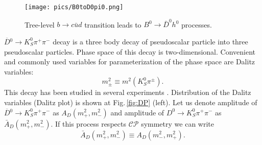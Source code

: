 \documentclass[preprint,aps,showpacs]{revtex4}
\newcommand{\cpconj}{\ensuremath{\mathcal{CP}}\xspace}
\newcommand{\kspp}{\ensuremath{K^0_S\pi^+\pi^-}\xspace}
\newcommand{\dbkpp}{\ensuremath{\overline{D}{}^0\to K^0_S\pi^+\pi^-}\xspace}
\newcommand{\bdh}{\ensuremath{B^0\to \bar D^0h^0}\xspace}
\begin{document}
\begin{figure}[htb]
\texttt{[image: pics/B0toD0pi0.png]}
\caption{Tree-level $b\to c\bar u d$ transition leads to \bdh processes.}
\label{fig:bdhpi}
\end{figure}

\dbkpp decay is a three body decay of pseudoscalar particle into three pseudoscalar particles. Phase space of this decay is two-dimensional. Convenient and commonly used variables for parameterization of the phase space are Dalitz variables:
\begin{equation}
 m^2_{\pm} \equiv m^2\left(K_S^0\pi^{\pm}\right).
\end{equation}
This decay has been studied in several experiments \cite{BaBar_model,Belle_model,mixing_peng}. Distribution of the Dalitz variables (Dalitz plot) is shown at Fig.\,\ref{fig:DP} (left). Let us denote amplitude of \dbkpp as $A_D(m^2_+,m^2_-)$ and amplitude of $D^0\to\kspp$ as $\bar A_D(m^2_+,m^2_-)$. If this process respects \cpconj symmetry we can write
\begin{equation}
 \bar A_D(m^2_+,m^2_-) \equiv A_D(m^2_-,m^2_+).
\end{equation}
\end{document}
